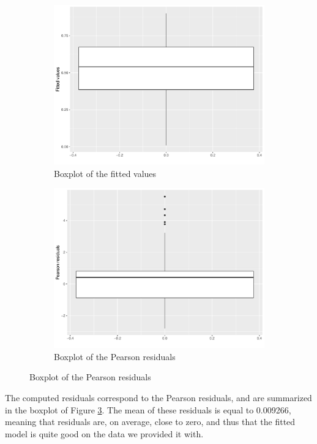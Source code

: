 \documentclass[a4paper, 12pt]{article}
\begin{document}
	\begin{figure}[h]
        \centering
        \begin{subfigure}{0.48\textwidth}
            \includegraphics[width = \textwidth]{resources/pdf/boxplots_fitted_values.pdf}
            \caption{Boxplot of the fitted values}
            \label{fig:boxplot_fitted_values}
        \end{subfigure}
        \hspace{0.5em}
        \begin{subfigure}{0.48\textwidth}
            \includegraphics[width=\textwidth]{resources/pdf/boxplots_residuals.pdf}
            \caption{Boxplot of the Pearson residuals}
            \label{fig:boxplot_pearson_residuals}
        \end{subfigure}
    \end{figure}
	The computed residuals correspond to the Pearson residuals, and are summarized in the boxplot of Figure \ref{fig:boxplot_pearson_residuals}. The mean of these residuals is equal to \num{0.009266}, meaning that residuals are, on average, close to zero, and thus that the fitted model is quite good on the data we provided it with.
	
\end{document}
